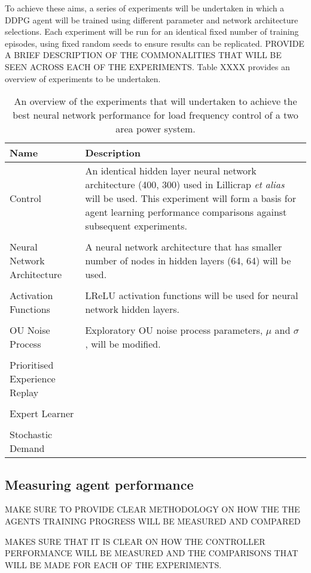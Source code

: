 To achieve these aims, a series of experiments will be undertaken in which a DDPG agent will be trained using different parameter and network architecture selections. Each experiment will be run for an identical fixed number of training episodes, using fixed random seeds to ensure results can be replicated. PROVIDE A BRIEF DESCRIPTION OF THE COMMONALITIES THAT WILL BE SEEN ACROSS EACH OF THE EXPERIMENTS. Table XXXX provides an overview of experiments to be undertaken.
\begin{table}[h]
	\centering
	\caption{An overview of the experiments that will undertaken to achieve the best neural network performance for load frequency control of a two area power system.}\label{key}
	\begin{tabular}{lp{9cm}}
		\toprule
		\textbf{Name} & \textbf{Description} \\
		\midrule
		Control & An identical hidden layer neural network architecture (400, 300) used in Lillicrap \textit{et alias} will be used. This experiment will form a basis for agent learning performance comparisons against subsequent experiments.\\
		 & \\
		Neural Network Architecture & A neural network architecture that has smaller number of nodes in hidden layers (64, 64) will be used. \\
		 & \\
		Activation Functions & LReLU activation functions will be used for neural network hidden layers.\\
		 & \\
		OU Noise Process & Exploratory OU noise process parameters, $\mu$ and $\sigma$, will be modified. \\
		 & \\
		Prioritised Experience Replay & \\
		 & \\
		Expert Learner & \\
		 & \\
		Stochastic Demand & \\
		\bottomrule
	\end{tabular}
\end{table}




\subsection{Measuring agent performance}
MAKE SURE TO PROVIDE CLEAR METHODOLOGY ON HOW THE THE AGENTS TRAINING PROGRESS WILL BE MEASURED AND COMPARED

MAKES SURE THAT IT IS CLEAR ON HOW THE CONTROLLER PERFORMANCE WILL BE MEASURED AND THE COMPARISONS THAT WILL BE MADE FOR EACH OF THE EXPERIMENTS.